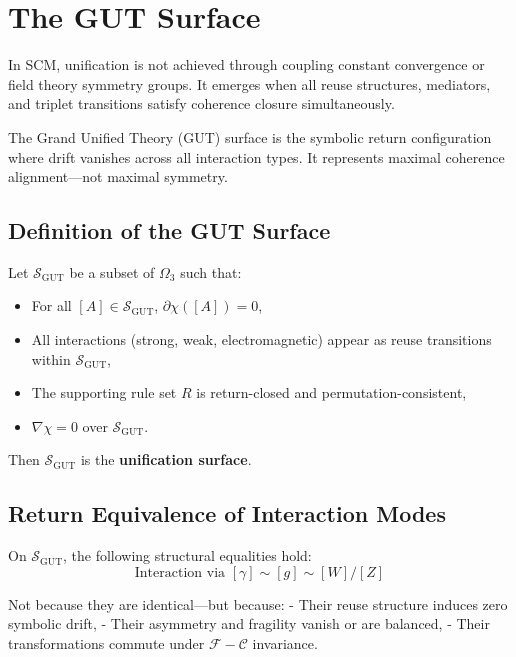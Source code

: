 \chapter{The GUT Surface} \label{chapter-gut-surface}

In SCM, unification is not achieved through coupling constant convergence or field theory symmetry groups. It emerges when all reuse structures, mediators, and triplet transitions satisfy coherence closure simultaneously.

The Grand Unified Theory (GUT) surface is the symbolic return configuration where drift vanishes across all interaction types. It represents maximal coherence alignment—not maximal symmetry.

\section{Definition of the GUT Surface} \label{sec:gut-definition}

Let $\mathcal{S}_{\text{GUT}}$ be a subset of $\Omega_3$ such that:

\begin{itemize}
  \item For all $[A] \in \mathcal{S}_{\text{GUT}}$, $\partial\chi([A]) = 0$,
  \item All interactions (strong, weak, electromagnetic) appear as reuse transitions within $\mathcal{S}_{\text{GUT}}$,
  \item The supporting rule set $R$ is return-closed and permutation-consistent,
  \item $\nabla\chi = 0$ over $\mathcal{S}_{\text{GUT}}$.
\end{itemize}

Then $\mathcal{S}_{\text{GUT}}$ is the \textbf{unification surface}.

\section{Return Equivalence of Interaction Modes} \label{sec:gut-interactions}

On $\mathcal{S}_{\text{GUT}}$, the following structural equalities hold:
\[
\text{Interaction via } [\gamma] \sim [g] \sim [W]/[Z]
\]

Not because they are identical—but because:
- Their reuse structure induces zero symbolic drift,
- Their asymmetry and fragility vanish or are balanced,
- Their transformations commute under $\mathcal{F} - \mathcal{C}$ invariance.

